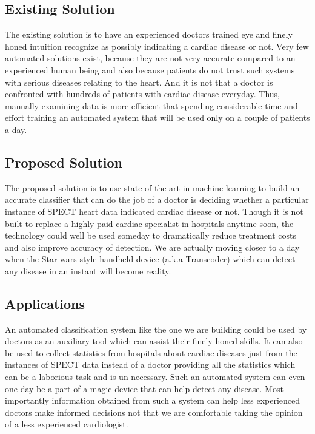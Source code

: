 \documentclass{acm_proc_article-sp}
\begin{document}
\subsection{Existing Solution}

The existing solution is to have an experienced doctors trained eye and finely honed intuition recognize as possibly indicating a cardiac disease or not. Very few automated solutions exist, because they are not very accurate compared to an experienced human being and also because patients do not trust such systems with serious diseases relating to the heart. And it is not that a doctor is confronted with hundreds of patients with cardiac disease everyday. Thus, manually examining data is more efficient that spending considerable time and effort training an automated system that will be used only on a couple of patients a day.  

\subsection{Proposed Solution}

The proposed solution is to use state-of-the-art in machine learning to build an accurate classifier that can do the job of a doctor is deciding whether a particular instance of SPECT heart data indicated cardiac disease or not. Though it is not built to replace a highly paid cardiac specialist in hospitals anytime soon, the technology could well be used someday to dramatically reduce treatment costs and also improve accuracy of detection. We are actually moving closer to a day when the Star wars style handheld device (a.k.a Transcoder) which can detect any disease in an instant will become reality.

\subsection{Applications}

An automated classification system like the one we are building could be used by doctors as an auxiliary tool which can assist their finely honed skills. It can also be used to collect statistics from hospitals about cardiac diseases just from the instances of SPECT data instead of a doctor providing all the statistics which can be a laborious task and is un-necessary. Such an automated system can even one day be a part of a magic device that can help detect any disease. Most importantly information obtained from such a system can help less experienced doctors make informed decisions not that we are comfortable taking the opinion of a less experienced cardiologist.
\end{document}

